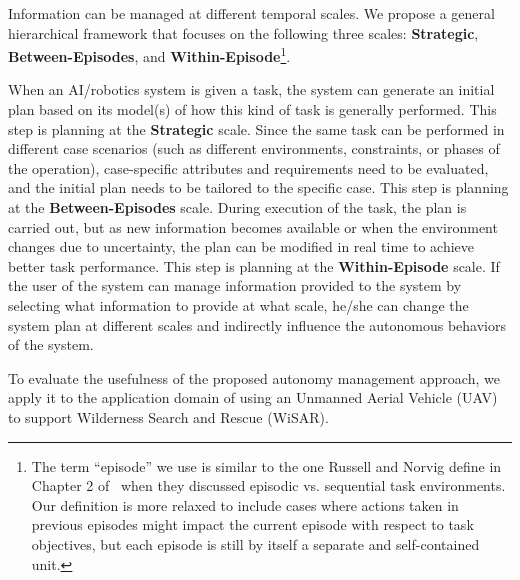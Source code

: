 Information can be managed at different temporal scales. 
We propose a general hierarchical framework that focuses on the following three scales: \textbf{Strategic}, \textbf{Between-Episodes}, and \textbf{Within-Episode}\footnote{The term ``episode'' we use is similar to the one Russell and Norvig define in Chapter 2 of~\cite{Russell2009Artificial} when they discussed episodic vs. sequential task environments. Our definition is more relaxed to include cases where actions taken in previous episodes might impact the current episode with respect to task objectives, but each episode is still by itself a separate and self-contained unit.}. 

When an AI/robotics system is given a task, the system can generate an initial plan based on its model(s) of how this kind of task is generally performed. This step is planning at the \textbf{Strategic} scale. Since the same task can be performed in different case scenarios (such as different environments, constraints, or phases of the operation), case-specific attributes and requirements need to be evaluated, and the initial plan needs to be tailored to the specific case. This step is planning at the \textbf{Between-Episodes} scale. During execution of the task, the plan is carried out, but as new information becomes available or when the environment changes due to uncertainty, the plan can be modified in real time to achieve better task performance. This step is planning at the \textbf{Within-Episode} scale. If the user of the system can manage information provided to the system by selecting what information to provide at what scale, he/she can change the system plan at different scales and indirectly influence the autonomous behaviors of the system.

To evaluate the usefulness of the proposed autonomy management approach, we apply it to the application domain of using an Unmanned Aerial Vehicle (UAV) to support Wilderness Search and Rescue (WiSAR).

